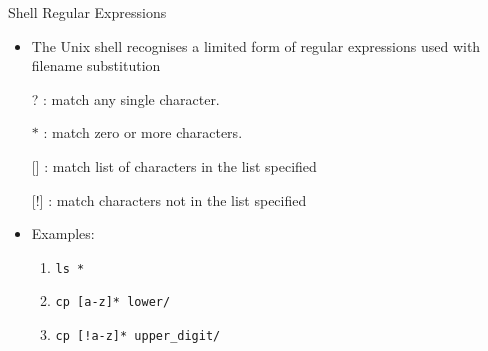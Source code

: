 \documentclass[slidestop,mathserif,compress,xcolor=svgnames]{beamer}
\begin{document}
\begin{frame}{\small Shell Regular Expressions}
  \begin{itemize}
    \item The Unix shell recognises a limited form of regular expressions used with filename substitution
    \item[?]: match any single character.
    \item[$\ast$]: match zero or more characters.
    \item[{[\quad]}]: match list of characters in the list specified
    \item[{[!\quad]}]: match characters not in the list specified
    \item Examples:
    \begin{enumerate}
      \item \texttt{ls *}
      \item \texttt{cp [a-z]* lower/}
      \item \texttt{cp [!a-z]* upper\_digit/}
    \end{enumerate}
  \end{itemize}
\end{frame}
\end{document}
